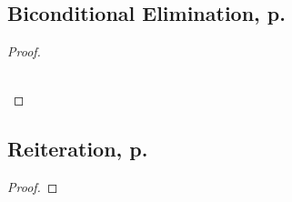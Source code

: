\begin{multicols}{2}
\subsection{Biconditional Elimination, p.\ \pageref{bielim}}
\begin{proof}
\\	
	 

\\	
	 
\end{proof}

\subsection{Reiteration, p.\ \pageref{reit}}

\begin{proof}
	\have[\ ]{}{\vdots}
	 
\end{proof}


\end{multicols}


